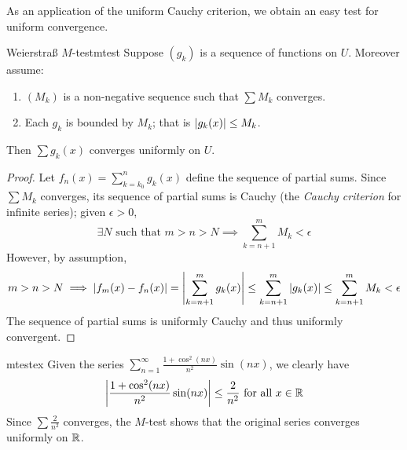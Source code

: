 As an application of the uniform Cauchy criterion, we obtain an easy test for uniform convergence.

\begin{thm}{Weierstraß $M$-test}{mtest}
	Suppose $(g_k)$ is a sequence of functions on $U$. Moreover assume:
	\begin{enumerate}
	  \item $(M_k)$ is a non-negative sequence such that $\sum M_k$ converges.
	  \item Each $g_k$ is bounded by $M_k$; that is $\left| g_k(x)\right|\le M_k$.
	\end{enumerate}
	Then $\sum g_k(x)$ converges uniformly on $U$.
\end{thm}

\begin{proof}
	Let $f_n(x)=\sum\limits_{k=k_0}^ng_k(x)$ define the sequence of partial sums. Since $\sum M_k$ converges, its sequence of partial sums is Cauchy (the \emph{Cauchy criterion} for infinite series); given $\epsilon>0$,
	\[
		\exists N\text{ such that }m>n>N
		\implies \sum_{k=n+1}^m M_k<\epsilon
	\]
	However, by assumption,
	\[
		m>n>N\implies \left| f_m(x)-f_n(x)\right|
		=\left| \sum_{k=n+1}^mg_k(x)\right| 
		\le \sum_{k=n+1}^m\left| g_k(x)\right| 
		\le\sum_{k=n+1}^mM_k<\epsilon
	\]
	The sequence of partial sums is uniformly Cauchy and thus uniformly convergent.
\end{proof}

\begin{example}{}{mtestex}
	Given the series $\sum\limits_{n=1}^\infty\frac{1+\cos^2(nx)}{n^2}\sin(nx)$, we clearly have
	\[
		\left| \frac{1+\cos^2(nx)}{n^2}\sin(nx)\right|
		\le\frac 2{n^2}\text{ for all }x\in\mathbb{R}
	\]
	Since $\sum\frac 2{n^2}$ converges, the $M$-test shows that the original series converges uniformly on $\mathbb{R}$.
\end{example}

\goodbreak

